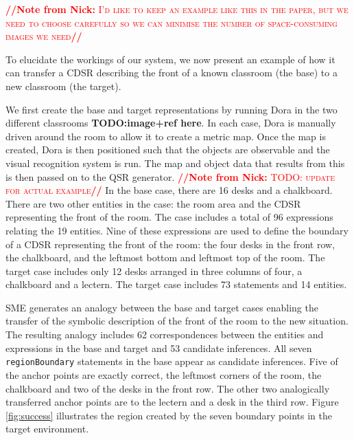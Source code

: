 \documentclass[letterpaper]{article}
\newcommand{\from}[2]{\textcolor{red}{\noindent\textbf{//}\textbf{Note
      from #1:}\textsc{ #2}\textbf{//}}}
\newcommand{\fw}[1]{\texttt{#1}}
\begin{document}
\from{Nick}{I'd like to keep an example like this in the paper, but we need to choose carefully so we can minimise the number of space-consuming images we need}

To elucidate the workings of our system, we now present an example of how it can transfer a CDSR describing the front of a known classroom (the base) to a new classroom (the target). 

We first create the base and target representations by running Dora in the two different classrooms \textbf{TODO:image+ref here}. In each case, Dora is manually driven around the room to allow it to create a metric map. Once the map is created, Dora is then positioned such that the objects are observable and the visual recognition system is run. The map and object data that results from this is then passed on to the QSR generator. \from{Nick}{TODO: update for actual example} In the base case, there are 16 desks and a chalkboard. There are two other entities in the case: the room area and the CDSR representing the front of the room. The case includes a total of 96 expressions relating the 19 entities. Nine of these expressions are used to define the boundary of a CDSR representing the front of the room: the four desks in the front row, the chalkboard, and the leftmost bottom and leftmost top of the room. The target case includes only 12 desks arranged in three columns of four, a chalkboard and a lectern. The target case includes 73 statements and 14 entities.

SME generates an analogy between the base and target cases enabling the transfer of the symbolic description of the front of the room to the new situation. The resulting analogy includes 62 correspondences between the entities and expressions in the base and target and 53 candidate inferences.  All seven \fw{regionBoundary} statements in the base appear as candidate inferences. Five of the anchor points are exactly correct, the leftmost corners of the room, the chalkboard and two of the desks in the front row. The other two analogically transferred anchor points are to the lectern and a desk in the third row. Figure \ref{fig:success} illustrates the region created by the seven boundary points in the target environment. 


\end{document}
